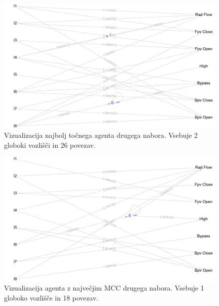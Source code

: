 \begin{figure}[H]
    \begin{center}
        \includegraphics[width=13cm]{shuttle/2/acc_g}
    \end{center}
    \caption{Vizualizacija najbolj točnega agenta drugega nabora. Vsebuje 2 globoki vozlišči in 26 povezav.}
    \label{fig:statlog_acc_2_g}
\end{figure}

\begin{figure}[H]
    \begin{center}
        \includegraphics[width=13cm]{shuttle/2/mcc_g}
    \end{center}
    \caption{Vizualizacija agenta z največjim MCC drugega nabora. Vsebuje 1 globoko vozlišče in 18 povezav.}
    \label{fig:statlog_mcc_2_g}
\end{figure}

